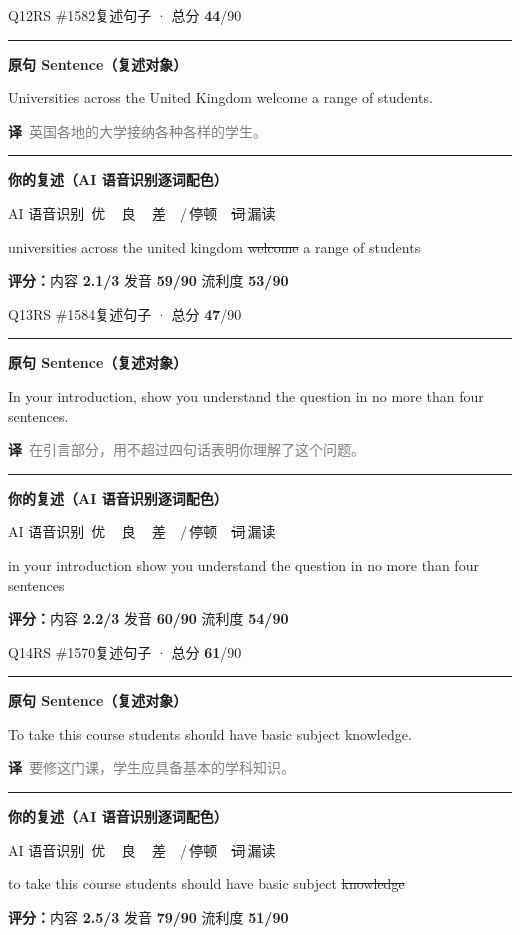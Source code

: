 \documentclass[11pt]{article}
\newcommand{\sfull}[1]{\textcolor{cFix}{\bfseries #1}}     %
\newcommand{\spart}[1]{\textcolor{cPartial}{\bfseries #1}} %
\newcommand{\ptesub}[1]{%
  \par\needspace{2\baselineskip}\smallskip
  {\color{cAccent}\rule[-0.2ex]{3pt}{1.05em}}\hspace{6pt}%
  {\bfseries\color{cHead}#1}\par\nopagebreak\smallskip}
\newcommand{\sg}[1]{\textcolor{cSpkGood}{#1}}   %
\newcommand{\sy}[1]{\textcolor{cSpkOk}{#1}}     %
\newcommand{\sr}[1]{\textcolor{cSpkBad}{#1}}    %
\newcommand{\smiss}[1]{\textcolor{cSpkBad}{\sout{#1}}}  %
\newcommand{\asrlegend}{{\footnotesize\color{gray}AI 语音识别\quad
  {\color{cSpkGood}\textbullet}\,优\ \ {\color{cSpkOk}\textbullet}\,良\ \
  {\color{cSpkBad}\textbullet}\,差\ \ {\color{gray}/}\,停顿\ \
  {\color{cSpkBad}\sout{词}}\,漏读}}
\newcommand{\zh}[1]{{\footnotesize\textcolor{cNote}{\textbf{译}}\ \textcolor{gray}{#1}}}
\begin{document}
\begin{qblock}{Q12\quad RS \#1582}{复述句子 · 总分 \textcolor{cAccent}{\bfseries 44}/90}
\ptesub{原句 Sentence（复述对象）}
\begin{promptbox}
Universities across the United Kingdom welcome a range of students.
\end{promptbox}
\zh{英国各地的大学接纳各种各样的学生。}
\ptesub{你的复述（AI 语音识别逐词配色）}
\asrlegend
\begin{asrbox}
\sg{universities} \sy{across} \sg{the} \sg{united} \sg{kingdom} \smiss{welcome} \sg{a} \sg{range} \sg{of} \sr{students}
\end{asrbox}
\smallskip
{\small\textbf{评分：}内容 \spart{2.1/3} \quad\textperiodcentered\quad 发音 \spart{59/90} \quad\textperiodcentered\quad 流利度 \spart{53/90}}
\end{qblock}

\begin{qblock}{Q13\quad RS \#1584}{复述句子 · 总分 \textcolor{cAccent}{\bfseries 47}/90}
\ptesub{原句 Sentence（复述对象）}
\begin{promptbox}
In your introduction, show you understand the question in no more than four sentences.
\end{promptbox}
\zh{在引言部分，用不超过四句话表明你理解了这个问题。}
\ptesub{你的复述（AI 语音识别逐词配色）}
\asrlegend
\begin{asrbox}
\sg{in} \sg{your} \sg{introduction} \sr{show} \sg{you} \sg{understand} \sg{the} \sg{question} \sg{in} \sg{no} \sr{more} \sr{than} \sg{four} \sg{sentences}
\end{asrbox}
\smallskip
{\small\textbf{评分：}内容 \sfull{2.2/3} \quad\textperiodcentered\quad 发音 \spart{60/90} \quad\textperiodcentered\quad 流利度 \spart{54/90}}
\end{qblock}

\begin{qblock}{Q14\quad RS \#1570}{复述句子 · 总分 \textcolor{cAccent}{\bfseries 61}/90}
\ptesub{原句 Sentence（复述对象）}
\begin{promptbox}
To take this course students should have basic subject knowledge.
\end{promptbox}
\zh{要修这门课，学生应具备基本的学科知识。}
\ptesub{你的复述（AI 语音识别逐词配色）}
\asrlegend
\begin{asrbox}
\sg{to} \sg{take} \sg{this} \sg{course} \sg{students} \sg{should} \sg{have} \sg{basic} \sr{subject} \smiss{knowledge}
\end{asrbox}
\smallskip
{\small\textbf{评分：}内容 \sfull{2.5/3} \quad\textperiodcentered\quad 发音 \sfull{79/90} \quad\textperiodcentered\quad 流利度 \spart{51/90}}\quad{\footnotesize\color{gray}（录音 0:11）}
\end{qblock}
\end{document}
